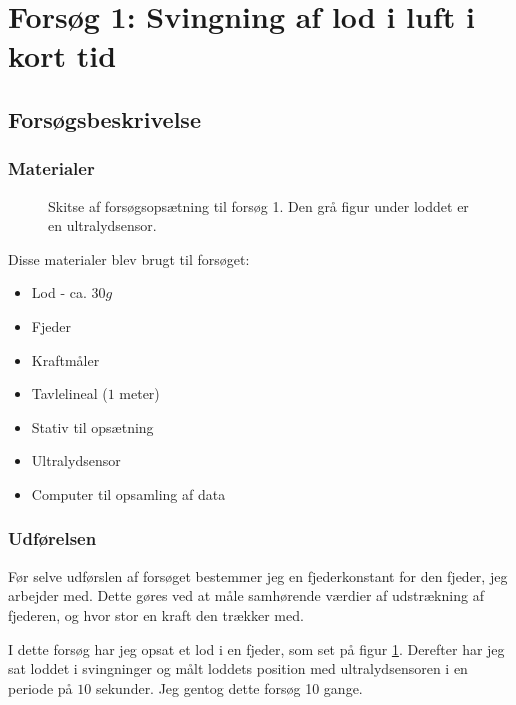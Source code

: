 \section{Forsøg 1: Svingning af lod i luft i kort tid}\label{exp1: Forsog 1 - hele afsnittet}

\subsection{Forsøgsbeskrivelse}\label{exp1: Beskrivelse af experiment}
\subsubsection{Materialer}
\begin{figure}
\centering
{}%

\caption{Skitse af forsøgsopsætning til forsøg 1. Den grå figur under loddet er en ultralydsensor.}
\label{fig:Forsogsopsaetning 1}
\end{figure} 

Disse materialer blev brugt til forsøget:
\begin{itemize}
	\setlength\itemsep{-1em}
	\item Lod - ca. $30g$
	\item Fjeder
	\item Kraftmåler
	\item Tavlelineal ($1$ meter)
	\item Stativ til opsætning
	\item Ultralydsensor
	\item Computer til opsamling af data
\end{itemize}

\subsubsection{Udførelsen}\label{exp1: Udforelse}



Før selve udførslen af forsøget bestemmer jeg en fjederkonstant for den fjeder, jeg arbejder med. 
Dette gøres ved at måle samhørende værdier af udstrækning af fjederen, og hvor stor en kraft den trækker med. 

I dette forsøg har jeg opsat et lod i en fjeder, som set på figur \ref{fig:Forsogsopsaetning 1}.
Derefter har jeg sat loddet i svingninger og målt loddets position med ultralydsensoren i en periode på $10$ sekunder. 
Jeg gentog dette forsøg 10 gange. 


